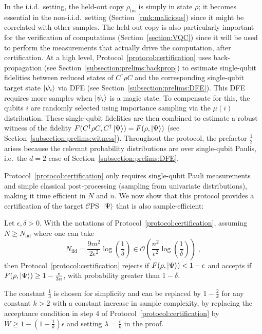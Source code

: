 \documentclass[a4paper,twocolumn,11pt,unpublished]{quantumarticle}
\newcommand{\np}{m}
\newcommand{\Niid}{N_{\mathrm{iid}}}
\newcommand{\CEPS}{$\mathcal C$PS}
\renewcommand{\O}{\mathcal O}
\begin{document}
        In the i.i.d.\ setting, the held-out copy $\rho_{\mathrm{fin}}$ is simply in state $\rho$; it becomes essential in the non-i.i.d.\ setting (Section~\ref{rmk:malicious}) since it might be correlated with other samples. The held-out copy is also particularly important for the verification of computations (Section~\ref{section:VQC}) since it will be used to perform the measurements that actually drive the computation, after certification. At a high level, Protocol~\ref{protocol:certification} uses back-propagation (see Section~\ref{subsection:prelims:backprop}) to estimate single-qubit fidelities between reduced states of $C^\dag\rho C$ and the corresponding single-qubit target state $\ket{\psi_i}$ via DFE (see Section~\ref{subsection:prelims:DFE}). This DFE requires more samples when $\ket{\psi_i}$ is a magic state. To compensate for this, the qubits $i$ are randomly selected using importance sampling via the $\mu(i)$ distribution. These single-qubit fidelities are then combined to estimate a robust witness of the fidelity $F(C^\dag\rho C,C^\dag\ket\Psi)=F(\rho,\ket\Psi)$ (see Section~\ref{subsection:prelims:witness}). Throughout the protocol, the prefactor $\tfrac12$ arises because the relevant probability distributions are over single-qubit Paulis, i.e.\ the $d=2$ case of Section~\ref{subsection:prelims:DFE}.
        
        Protocol~\ref{protocol:certification} only requires single-qubit Pauli measurements and simple classical post-processing (sampling from univariate distributions), making it time efficient in $N$ and $n$. We now show that this protocol provides a certification of the target \CEPS\ $\ket\Psi$ that is also sample-efficient:

        \begin{theorem}[Efficient certification of \CEPS]
        \label{theorem:certification}
            Let $\epsilon,\delta>0$. With the notations of Protocol~\ref{protocol:certification}, assuming $N\ge \Niid$ where one can take
            \begin{equation}
            \label{eq:certification:sample iid}
            \Niid = \frac{9\np^2}{2\epsilon^2} \log\left(\frac{1}{\delta}\right)
                    \in\O\left(
                    \frac{n^2}{\epsilon^2} \log\left(\frac{1}{\delta}\right)
                    \right)
                    \; ,
            \end{equation}
                 then Protocol~\ref{protocol:certification} rejects if $F(\rho,\ket\Psi)<1-\epsilon$ and accepts if $F(\rho,\ket\Psi)\ge1-\frac\epsilon{3n}$, with probability greater than $1-\delta$.
        \end{theorem}
        The constant $\frac13$ is chosen for simplicity and can be replaced by $1-\frac2k$ for any constant $k>2$ with a constant increase in sample complexity, by replacing the acceptance condition in step 4 of Protocol~\ref{protocol:certification} by $\bar W\ge1-(1-\frac1k)\epsilon$ and setting $\lambda=\frac\epsilon k$ in the proof.
\end{document}
